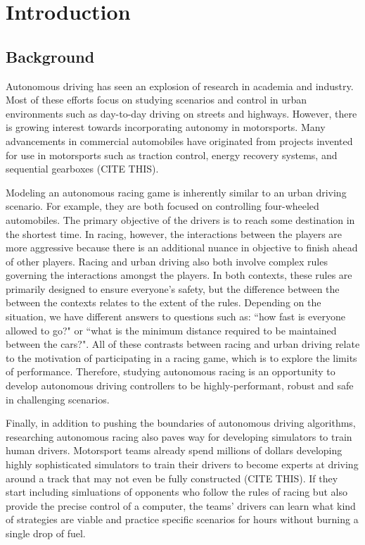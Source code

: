 \chapter{Introduction} \label{chapter:intro}
\section{Background} %
Autonomous driving has seen an explosion of research in academia and industry. Most of these efforts focus on studying scenarios and control in urban environments such as day-to-day driving on streets and highways. However, there is growing interest towards incorporating autonomy in motorsports. Many advancements in commercial automobiles have originated from projects invented for use in motorsports such as traction control, energy recovery systems, and sequential gearboxes (CITE THIS). 

Modeling an autonomous racing game is inherently similar to an urban driving scenario. For example, they are both focused on controlling four-wheeled automobiles. The primary objective of the drivers is to reach some destination in the shortest time. In racing, however, the interactions between the players are more aggressive because there is an additional nuance in objective to finish ahead of other players. Racing and urban driving also both involve complex rules governing the interactions amongst the players. In both contexts, these rules are primarily designed to ensure everyone's safety, but the difference between the between the contexts relates to the extent of the rules. Depending on the situation, we have different answers to questions such as: ``how fast is everyone allowed to go?" or ``what is the minimum distance required to be maintained between the cars?". All of these contrasts between racing and urban driving relate to the motivation of participating in a racing game, which is to explore the limits of performance. Therefore, studying autonomous racing is an opportunity to develop autonomous driving controllers to be highly-performant, robust and safe in challenging scenarios. 

Finally, in addition to pushing the boundaries of autonomous driving algorithms, researching autonomous racing also paves way for developing simulators to train human drivers. Motorsport teams already spend millions of dollars developing highly sophisticated simulators to train their drivers to become experts at driving around a track that may not even be fully constructed (CITE THIS). If they start including simluations of opponents who follow the rules of racing but also provide the precise control of a computer, the teams' drivers can learn what kind of strategies are viable and practice specific scenarios for hours without burning a single drop of fuel.

